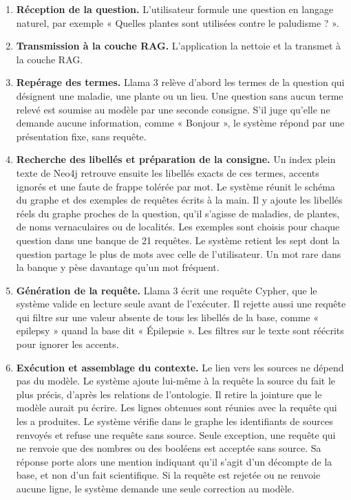 \begin{enumerate}[label=\textbf{\arabic*.}, leftmargin=1.2cm]
    \item \textbf{Réception de la question.} L'utilisateur formule une question en langage naturel, par exemple « Quelles plantes sont utilisées contre le paludisme ? ».
    \item \textbf{Transmission à la couche RAG.} L'application la nettoie et la transmet à la couche RAG.
    \item \textbf{Repérage des termes.} Llama 3 relève d'abord les termes de la question qui désignent une maladie, une plante ou un lieu. Une question sans aucun terme relevé est soumise au modèle par une seconde consigne. S'il juge qu'elle ne demande aucune information, comme « Bonjour », le système répond par une présentation fixe, sans requête.
    \item \textbf{Recherche des libellés et préparation de la consigne.} Un index plein texte de Neo4j retrouve ensuite les libellés exacts de ces termes, accents ignorés et une faute de frappe tolérée par mot. Le système réunit le schéma du graphe et des exemples de requêtes écrits à la main. Il y ajoute les libellés réels du graphe proches de la question, qu'il s'agisse de maladies, de plantes, de noms vernaculaires ou de localités. Les exemples sont choisis pour chaque question dans une banque de 21 requêtes. Le système retient les sept dont la question partage le plus de mots avec celle de l'utilisateur. Un mot rare dans la banque y pèse davantage qu'un mot fréquent.
    \item \textbf{Génération de la requête.} Llama 3 écrit une requête Cypher, que le système valide en lecture seule avant de l'exécuter. Il rejette aussi une requête qui filtre sur une valeur absente de tous les libellés de la base, comme « epilepsy » quand la base dit « Épilepsie ». Les filtres sur le texte sont réécrits pour ignorer les accents.
    \item \textbf{Exécution et assemblage du contexte.} Le lien vers les sources ne dépend pas du modèle. Le système ajoute lui-même à la requête la source du fait le plus précis, d'après les relations de l'ontologie. Il retire la jointure que le modèle aurait pu écrire. Les lignes obtenues sont réunies avec la requête qui les a produites. Le système vérifie dans le graphe les identifiants de sources renvoyés et refuse une requête sans source. Seule exception, une requête qui ne renvoie que des nombres ou des booléens est acceptée sans source. Sa réponse porte alors une mention indiquant qu'il s'agit d'un décompte de la base, et non d'un fait scientifique. Si la requête est rejetée ou ne renvoie aucune ligne, le système demande une seule correction au modèle.

\end{enumerate}
